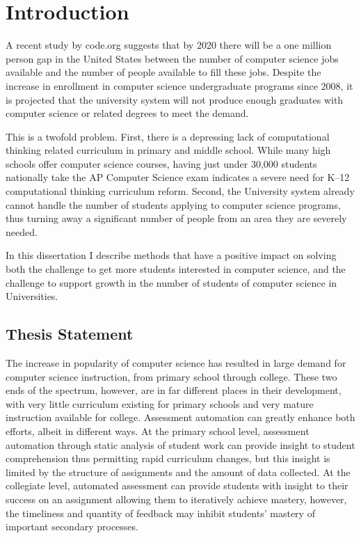 \chapter{Introduction}
A recent study by code.org suggests that by 2020 there will be a one million
person gap in the United States between the number of computer science jobs
available and the number of people available to fill these jobs. Despite the
increase in enrollment in computer science undergraduate programs since 2008,
it is projected that the university system will not produce enough graduates
with computer science or related degrees to meet the demand.

This is a twofold problem. First, there is a depressing lack of computational
thinking related curriculum in primary and middle school. While many high
schools offer computer science courses, having just under 30,000 students
nationally take the AP Computer Science exam indicates a severe need for K--12
computational thinking curriculum reform. Second, the University system already
cannot handle the number of students applying to computer science programs,
thus turning away a significant number of people from an area they are severely
needed.

In this dissertation I describe methods that have a positive impact on solving
both the challenge to get more students interested in computer science, and the
challenge to support growth in the number of students of computer science in
Universities.

\section{Thesis Statement}
The increase in popularity of computer science has resulted in large demand for
computer science instruction, from primary school through college. These two
ends of the spectrum, however, are in far different places in their
development, with very little curriculum existing for primary schools and very
mature instruction available for college. Assessment automation can greatly
enhance both efforts, albeit in different ways. At the primary school level,
assessment automation through static analysis of student work can provide
insight to student comprehension thus permitting rapid curriculum changes, but
this insight is limited by the structure of assignments and the amount of data
collected. At the collegiate level, automated assessment can provide students
with insight to their success on an assignment allowing them to iteratively
achieve mastery, however, the timeliness and quantity of feedback may inhibit
students' mastery of important secondary processes.

